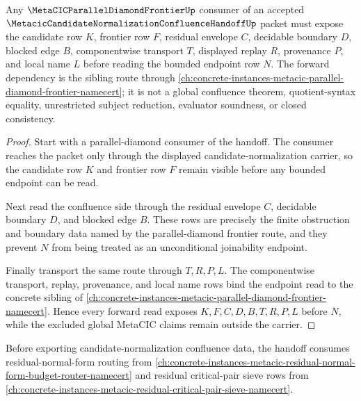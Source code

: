 \begin{theorem}
\label{thm:metacic-candidate-normalization-confluence-handoff-parallel-diamond-forward-link}
Any $\MetaCICParallelDiamondFrontierUp$ consumer of an accepted $\MetacicCandidateNormalizationConfluenceHandoffUp$ packet must expose the candidate row $K$, frontier row $F$, residual envelope $C$, decidable boundary $D$, blocked edge $B$, componentwise transport $T$, displayed replay $R$, provenance $P$, and local name $L$ before reading the bounded endpoint row $N$. The forward dependency is the sibling route through \autoref{ch:concrete-instances-metacic-parallel-diamond-frontier-namecert}; it is not a global confluence theorem, quotient-syntax equality, unrestricted subject reduction, evaluator soundness, or closed consistency.
\end{theorem}
\begin{proof}
Start with a parallel-diamond consumer of the handoff. The consumer reaches the packet only through the displayed candidate-normalization carrier, so the candidate row $K$ and frontier row $F$ remain visible before any bounded endpoint can be read.

Next read the confluence side through the residual envelope $C$, decidable boundary $D$, and blocked edge $B$. These rows are precisely the finite obstruction and boundary data named by the parallel-diamond frontier route, and they prevent $N$ from being treated as an unconditional joinability endpoint.

Finally transport the same route through $T,R,P,L$. The componentwise transport, replay, provenance, and local name rows bind the endpoint read to the concrete sibling of \autoref{ch:concrete-instances-metacic-parallel-diamond-frontier-namecert}. Hence every forward read exposes $K,F,C,D,B,T,R,P,L$ before $N$, while the excluded global MetaCIC claims remain outside the carrier.
\end{proof}

Before exporting candidate-normalization confluence data, the handoff consumes residual-normal-form routing from \autoref{ch:concrete-instances-metacic-residual-normal-form-budget-router-namecert} and residual critical-pair sieve rows from \autoref{ch:concrete-instances-metacic-residual-critical-pair-sieve-namecert}.

